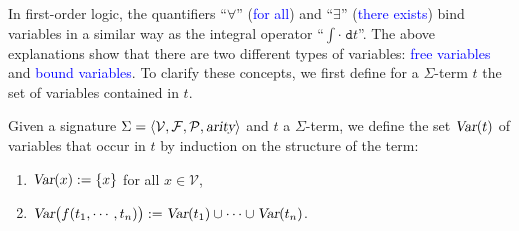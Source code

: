 In first-order logic, the quantifiers ``$\forall$'' (\textcolor{blue}{for all}) and ``$\exists$''
(\textcolor{blue}{there exists}) bind variables in a similar way as the integral operator
``$\int \cdot\; \mathtt{d}t$''. The above explanations show that there are two different types of 
variables: \textcolor{blue}{free variables} and \textcolor{blue}{bound variables}.
To clarify these concepts, we first define for a
$\Sigma$-term $t$ the set of variables contained in $t$.

\begin{Definition}[$\var(t)$]
  Given a signature $\Sigma = \langle \mathcal{V}, \mathcal{F}, \mathcal{P}, \textsl{arity} \rangle$ and
  $t$ a $\Sigma$-term, we define the set \textcolor{blue}{$\var(t)$} of variables that occur in $t$
  by induction on the structure of the term:
  \begin{enumerate}
    \item $\textsl{Var}(x) := \{ x \}$ \quad for all $x \in \mathcal{V}$,
    \item $\textsl{Var}\bigl(f(t_1,\cdots,t_n)\bigr) := \textsl{Var}(t_1) \cup \cdots \cup \textsl{Var}(t_n)$.
          \eox
  \end{enumerate}
\end{Definition}


